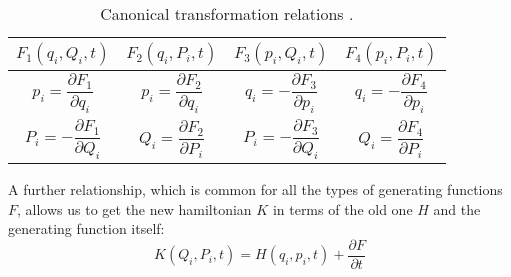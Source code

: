 	\begin{table}[!htb]
	\begin{center}
	\begin{tabular}{|c|c|c|c|}
	\hline 
	\rowcolor{Gray!10}
	$F_1(q_i, Q_i, t)$ & $F_2(q_i, P_i, t)$ & $F_3(p_i, Q_i, t)$ & $F_4(p_i, P_i, t)$ \\ 
	\hline
	\hline 
	$p_i = \dfrac{\partial F_1}{\partial q_i}$ & $p_i = \dfrac{\partial F_2}{\partial q_i}$ & $q_i= -\dfrac{\partial F_3}{\partial p_i}$ & $q_i = -\dfrac{\partial F_4}{\partial p_i}$ 	\\ 
	\hline 
	$P_i = -\dfrac{\partial F_1}{\partial Q_i}$ & $Q_i = \dfrac{\partial F_2}{\partial P_i}$ & $P_i = - \dfrac{\partial F_3}{\partial Q_i}$ & $Q_i = \dfrac{\partial F_4}{\partial P_i}$ \\ 
	\hline 
	\end{tabular} 
	\caption{Canonical transformation relations \cite{Wiesel}.}
	\label{tabAppC:Can_table}
	\end{center}
	\end{table}	
	\indent A further relationship, which is common for all the types of generating functions $F$, allows us to get the new hamiltonian $K$ in terms of the old one $H$ and the generating function itself:
	\begin{equation}
	\label{eqAppC:Ham_tx}K(Q_i, P_i, t) = H(q_i, p_i, t) + \dfrac{\partial F}{ \partial t}
	\end{equation}
